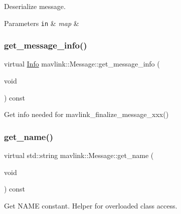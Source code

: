 Deserialize message.


\begin{DoxyParams}[1]{Parameters}
\mbox{\tt in}  & {\em map} & \\
\hline
\end{DoxyParams}
\mbox{\label{structmavlink_1_1Message_abf1ca05ae7564100d52b04473a784d1c}} 
\subsubsection{\texorpdfstring{get\+\_\+message\+\_\+info()}{get\_message\_info()}}
{\footnotesize\ttfamily virtual \hyperlink{structmavlink_1_1Message_1_1Info}{Info} mavlink\+::\+Message\+::get\+\_\+message\+\_\+info (\begin{DoxyParamCaption}\item[{void}]{ }\end{DoxyParamCaption}) const\hspace{0.3cm}{\ttfamily [pure virtual]}}

Get info needed for mavlink\+\_\+finalize\+\_\+message\+\_\+xxx() \mbox{\label{structmavlink_1_1Message_acfcd821ce25f7e4e2633f44d4a57b185}} 
\subsubsection{\texorpdfstring{get\+\_\+name()}{get\_name()}}
{\footnotesize\ttfamily virtual std\+::string mavlink\+::\+Message\+::get\+\_\+name (\begin{DoxyParamCaption}\item[{void}]{ }\end{DoxyParamCaption}) const\hspace{0.3cm}{\ttfamily [pure virtual]}}

Get N\+A\+ME constant. Helper for overloaded class access. \mbox{\label{structmavlink_1_1Message_a8aebc1882e5e4b7838909b5fdd56ef1d}} 
